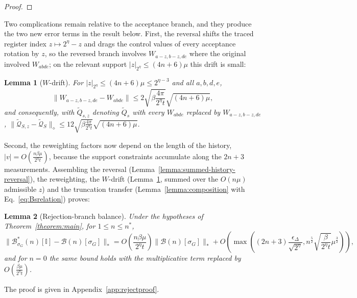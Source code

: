 \documentclass[aps,floatfix,10pt,amssymb,amsfont,amsmath,superscriptaddress,float,nofootinbib,longbibliography,nobalancelastpage,twocolumn]{revtex4-2}
\newtheorem{lemma}{Lemma}
\begin{document}
\begin{widetext}
\begin{proof}
\end{proof}
Two complications remain relative to the acceptance branch, and they produce the two new error terms in the result below. First, the reversal shifts the traced register index $z \mapsto 2^{\eta}-z$ and drags the control values of every acceptance rotation by $z$, so the reversed branch involves $W_{a-z,b-z,de}$ where the original involved $W_{abde}$; on the relevant support $|z|_{2^{\eta}} \leq (4n+6)\mu$ this drift is small:
\begin{lemma}[$W$-drift]
\label{lemma:wdrift}
For $|z|_{2^{\eta}} \leq (4n+6)\mu \leq 2^{\eta-3}$ and all $a,b,d,e$,
\begin{equation}
    \|W_{a-z,b-z,de} - W_{abde}\| \leq 2\sqrt{\beta\frac{4\pi}{2^{\eta}t}}\sqrt{(4n+6)\mu},
\end{equation}
and consequently, with $\tilde Q_{s,z}$ denoting $\tilde Q_s$ with every $W_{abde}$ replaced by $W_{a-z,b-z,de}$, $\|\tilde{\mathcal{Q}}_{S,z} - \tilde{\mathcal{Q}}_S\|_{\diamond} \leq 12\sqrt{\beta\frac{4\pi}{2^{\eta}t}}\sqrt{(4n+6)\mu}$.
\end{lemma}
Second, the reweighting factors now depend on the length of the history, $|v| = O(\frac{n\beta\mu}{2^{\eta}t})$, because the support constraints accumulate along the $2n+3$ measurements. Assembling the reversal (Lemma~\ref{lemma:summed-history-reversal}), the reweighting, the $W$-drift (Lemma~\ref{lemma:wdrift}, summed over the $O(n\mu)$ admissible $z$) and the truncation transfer (Lemma~\ref{lemma:composition} with Eq.~\eqref{eq:Bsrelation}) proves:
\begin{lemma}[Rejection-branch balance]
\label{lemma:B}
Under the hypotheses of Theorem~\ref{theorem:main}, for $1 \leq n \leq n^*$,
\begin{equation}
    \|\mathcal{B}^*_{\sigma_G}(n)[\mathbb{I}] - \mathcal{B}(n)[\sigma_G]\|_* = O\left(\frac{n\beta\mu}{2^{\eta}t} \right)\|\mathcal{B}(n)[\sigma_G]\|_* +O\left(\max\left((2n+3)\frac{\epsilon_{\Delta}}{\sqrt{2^{\eta}}},n^{\frac{5}{2}}\sqrt{\frac{\beta }{2^{\eta}t}}\mu^{\frac{3}{2}}\right)\right),
\end{equation}
and for $n = 0$ the same bound holds with the multiplicative term replaced by $O(\frac{\beta\mu}{2^{\eta}t})$.
\end{lemma}
The proof is given in Appendix~\ref{app:rejectproof}.
\end{widetext}
\end{document}
